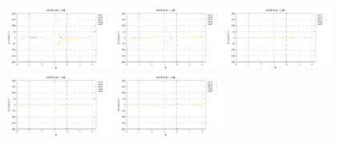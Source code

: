 \noindent
\includegraphics[width=3.5cm]{python_codes/fieldstone_152/RESULTS/exp1_2D/qqq_16_m2}
\includegraphics[width=3.5cm]{python_codes/fieldstone_152/RESULTS/exp1_2D/qqq_16_m3}
\includegraphics[width=3.5cm]{python_codes/fieldstone_152/RESULTS/exp1_2D/qqq_16_m4}
\includegraphics[width=3.5cm]{python_codes/fieldstone_152/RESULTS/exp1_2D/qqq_16_m5}
\includegraphics[width=3.5cm]{python_codes/fieldstone_152/RESULTS/exp1_2D/qqq_16_m6}

